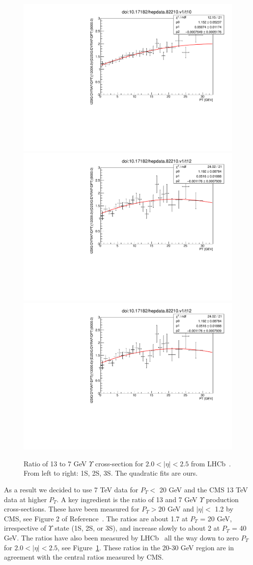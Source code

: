 \documentclass[12pt]{article}
\begin{document}
\begin{figure}
\begin{adjustwidth}{-3cm}{-3cm}
\centering
\includegraphics[width=0.32\linewidth]{../oniaDirect/LHCB-13-TeV/ups1s-13to7eta20to25.pdf}
\includegraphics[width=0.32\linewidth]{../oniaDirect/LHCB-13-TeV/ups3s-13to7eta20to25.pdf}
\includegraphics[width=0.32\linewidth]{../oniaDirect/LHCB-13-TeV/ups3s-13to7eta20to25.pdf}
\end{adjustwidth}
\caption{\protect Ratio of 13 to 7 GeV $\Upsilon$ cross-section for $2.0 < |\eta| < 2.5$
  from LHCb~\cite{Aaij:2018pfp}.  From left to right: 1S, 2S, 3S. 
  The quadratic fits are ours.}
\label{fig:upsratio}
\end{figure}

  
  As a result we decided to use 7 TeV data for $P_T <$ 20 GeV and the CMS
  13 TeV data at higher $P_T$.  A key ingredient is the ratio of 13 and 7
  GeV $\Upsilon$ production cross-sections.  These have been measured
  for $P_T > 20$ GeV and $|\eta| <$ 1.2 by CMS,
  see Figure 2 of Reference~\cite{Sirunyan:2017qdw}. The ratios
  are about 1.7 at $P_T$ = 20 GeV, irrespective of $\Upsilon$ state
  (1S, 2S, or 3S), and increase slowly to about 2
  at $P_T$ = 40 GeV.  The ratios have also been measured by
  LHCb~\cite{Aaij:2018pfp}
  all the way down to zero $P_T$ for $2.0 < |\eta| < 2.5$, see Figure~\ref{fig:upsratio}.
  These ratios in the 20-30 GeV region are in agreement with the central
  ratios measured by CMS.
\end{document}
